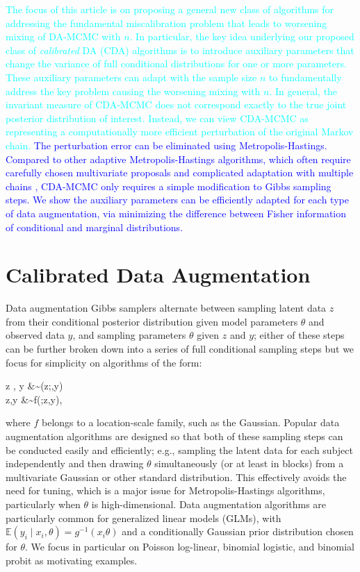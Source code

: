 \documentclass[11pt]{article}
\newcommand{\leojames}[1]{\textcolor{blue}{#1}}
\newcommand{\dave}[1]{{\textcolor{cyan}{#1}}}
\newcommand{\be}{\begin{equs}}
\newcommand{\ee}{\end{equs}}
\newcommand{\bb}[1]{\mathbb{#1}}
\begin{document}
\dave{The focus of this article is on proposing a general new class of algorithms for addressing the fundamental miscalibration problem that leads to worsening mixing of  DA-MCMC with $n$.  In particular, the key idea underlying our proposed class of {\em calibrated} DA (CDA) algorithms is to introduce auxiliary parameters that change the variance of full conditional distributions for one or more parameters. These auxiliary parameters can adapt with the sample size $n$ to fundamentally address the key problem causing the worsening mixing with $n$.  In general, the invariant measure of CDA-MCMC does not correspond exactly to the true joint posterior distribution of interest. Instead, we can view CDA-MCMC as representing a computationally more efficient perturbation of the original Markov chain. \leojames{ The perturbation error can be eliminated using Metropolis-Hastings. Compared to other adaptive Metropolis-Hastings algorithms,
which often require carefully chosen multivariate proposals and complicated adaptation with multiple chains  \citep{tran2016adaptive}, CDA-MCMC only
requires a simple modification to Gibbs sampling steps. We show the auxiliary parameters can be efficiently adapted for each type of data augmentation, via minimizing
the difference between Fisher information of conditional and
marginal distributions.}}


\section{Calibrated Data Augmentation} \label{sec:cda}
Data augmentation Gibbs samplers alternate between sampling  latent data $z$ from their conditional posterior distribution given model parameters $\theta$ and observed data $y$, and sampling parameters $\theta$ given $z$ and $y$; either of these steps can be further broken down into a series of full conditional sampling steps but we focus for simplicity on algorithms of the form: 
\be \label{eq:da}
z \mid \theta, y &\sim \pi(z;\theta,y) \\
\theta \mid z,y &\sim f(\theta;z,y),
\ee
where $f$ belongs to a location-scale family, such as the Gaussian.  Popular data augmentation algorithms are designed so that both of these sampling steps can be conducted easily and efficiently; e.g., sampling the latent data for each subject independently and then drawing $\theta$ simultaneously (or at least in blocks) from a multivariate Gaussian or other standard distribution.  This effectively avoids the need for tuning, which is a major issue for Metropolis-Hastings algorithms, particularly when $\theta$ is high-dimensional.
Data augmentation algorithms are particularly common for generalized linear models (GLMs), with $\bb E(y_i \mid x_i, \theta) = g^{-1}(x_i \theta)$ and a conditionally Gaussian prior distribution chosen for $\theta$. We focus in particular on Poisson log-linear, binomial logistic, and binomial probit as motivating examples.
\end{document}
